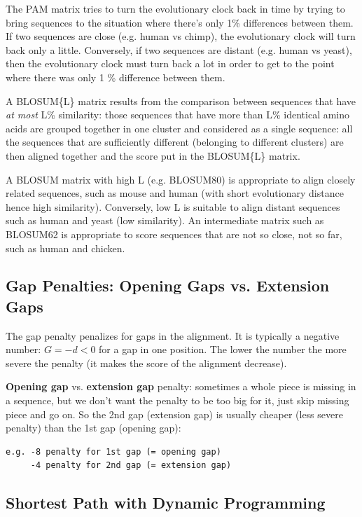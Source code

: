 The PAM matrix tries to turn the evolutionary clock back in time by trying to bring sequences to the situation where there's only 1\% differences between them.
If two sequences are close (e.g. human vs chimp), the evolutionary clock will turn back only a little.
Conversely, if two sequences are distant (e.g. human vs yeast), then the evolutionary clock must turn back a lot in order to get to the point where there was only 1 \% difference between them.

A BLOSUM\{L\} matrix results from the comparison between sequences that have {\em at most} L\% similarity: those sequences that have more than L\% identical amino acids are grouped together in one cluster and considered as a single sequence: all the sequences that are sufficiently different (belonging to different clusters) are then aligned together and the score put in the BLOSUM\{L\}  matrix. 

A BLOSUM matrix with high L (e.g. BLOSUM80) is appropriate to align closely related sequences, such as mouse and human (with short evolutionary distance hence high similarity). Conversely, low L is suitable to align distant sequences such as human and yeast (low similarity). An intermediate matrix such as BLOSUM62 is appropriate to score sequences that are not so close, not so far, such as human and chicken.

\subsection{Gap Penalties: Opening Gaps vs. Extension Gaps}

The gap penalty penalizes for gaps in the alignment. It is typically a negative number: $G = - d < 0$ for a gap in one position. The lower the  number the more severe the penalty (it makes the score of the alignment decrease).

{\bf Opening gap} vs. {\bf extension gap} penalty: sometimes a whole piece is missing in a sequence, but we don't want the penalty to be too big for it, just skip missing piece and go on. So the 2nd gap (extension gap) is usually cheaper (less severe penalty) than the 1st gap (opening gap):
\begin{verbatim}
e.g. -8 penalty for 1st gap (= opening gap)
     -4 penalty for 2nd gap (= extension gap)
\end{verbatim}

\subsection{Shortest Path with Dynamic Programming}

